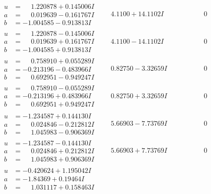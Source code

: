 \documentclass[1p]{elsarticle_modified}
\theoremstyle{definition}
\begin{document}
$$\begin{array}{c|c|c}
\begin{aligned}
u &= \phantom{-}1.220878 + 0.145006 I \\
a &= \phantom{-}0.019639 - 0.161767 I \\
b &= -1.004585 - 0.913813 I\end{aligned}
 & \phantom{-}4.1100 + 14.1102 I & \phantom{-0.000000 } 0 \\ \hline\begin{aligned}
u &= \phantom{-}1.220878 - 0.145006 I \\
a &= \phantom{-}0.019639 + 0.161767 I \\
b &= -1.004585 + 0.913813 I\end{aligned}
 & \phantom{-}4.1100 - 14.1102 I & \phantom{-0.000000 } 0 \\ \hline\begin{aligned}
u &= \phantom{-}0.758910 + 0.055289 I \\
a &= -0.213196 - 0.483966 I \\
b &= \phantom{-}0.692951 - 0.949247 I\end{aligned}
 & \phantom{-}0.82750 - 3.32659 I & \phantom{-0.000000 } 0 \\ \hline\begin{aligned}
u &= \phantom{-}0.758910 - 0.055289 I \\
a &= -0.213196 + 0.483966 I \\
b &= \phantom{-}0.692951 + 0.949247 I\end{aligned}
 & \phantom{-}0.82750 + 3.32659 I & \phantom{-0.000000 } 0 \\ \hline\begin{aligned}
u &= -1.234587 + 0.144130 I \\
a &= \phantom{-}0.024846 - 0.212812 I \\
b &= \phantom{-}1.045983 - 0.906369 I\end{aligned}
 & \phantom{-}5.66903 - 7.73769 I & \phantom{-0.000000 } 0 \\ \hline\begin{aligned}
u &= -1.234587 - 0.144130 I \\
a &= \phantom{-}0.024846 + 0.212812 I \\
b &= \phantom{-}1.045983 + 0.906369 I\end{aligned}
 & \phantom{-}5.66903 + 7.73769 I & \phantom{-0.000000 } 0 \\ \hline\begin{aligned}
u &= -0.420624 + 1.195042 I \\
a &= -1.84369 + 0.19464 I \\
b &= \phantom{-}1.031117 + 0.158463 I\end{aligned}

\end{array}$$
\end{document}
